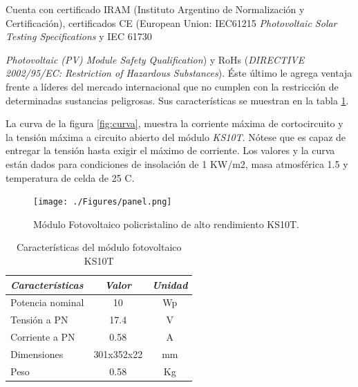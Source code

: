 Cuenta con certificado IRAM (Instituto Argentino de Normalización y Certificación), certificados CE (European Union: IEC61215 \textit{Photovoltaic Solar Testing Specifications} y IEC 61730 {\textit{Photovoltaic (PV) Module Safety Qualification}) y RoHs (\textit{DIRECTIVE 2002/95/EC: Restriction of Hazardous Substances}). Éste último le agrega ventaja frente a líderes del mercado internacional que no cumplen con la restricción de determinadas sustancias peligrosas. Sus características se muestran en la tabla \ref{tab:ks10t}. 

La curva de la figura \ref{fig:curva}, muestra la corriente máxima de cortocircuito y la tensión máxima a circuito abierto del módulo \textit{KS10T}. Nótese que es capaz de entregar la tensión hasta exigir el máximo de corriente. Los valores y la curva están dados para condiciones de insolación de 1 KW/m2, masa atmosférica 1.5 y temperatura de celda de 25 \grados C\citep{solar}.

\vspace{10px}
 \begin{figure}[h!]
	\centering
    \texttt{[image: ./Figures/panel.png]}
    	\caption{Módulo Fotovoltaico policristalino de alto rendimiento KS10T.}
	\label{fig:ks10t}
\end{figure}

\vspace{30px}
\begin{table}[ht]
	\centering
	\caption{Características del módulo fotovoltaico KS10T}
	\begin{tabular}{@{} l *2c @{}}    \toprule
		\emph{\textbf{Características}} & \emph{\textbf{Valor}} & \emph{\textbf{Unidad}}\\
		\midrule
		Potencia nominal	& 10 	& Wp	\\	
		Tensión a PN		& 17.4	& V\\
		Corriente a PN	& 0.58		& A\\
		Dimensiones		& 301x352x22 	& mm\\
		Peso				& 0.58		& Kg	\\
		\bottomrule
		\hline
	\end{tabular}
	\label{tab:ks10t}
\end{table}



}
